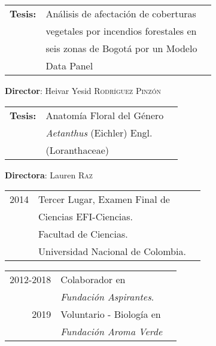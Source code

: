 
\vspace{0.2mm}
\begin{tabular}{rll}
     \textbf{Tesis:} & Análisis de afectación de coberturas \\
     & vegetales por incendios forestales en \\ 
     & seis zonas de Bogotá por un Modelo \\
     & Data Panel
\end{tabular}
\textbf{Director}: Heivar Yesid \textsc{Rodríguez Pinzón}
\divider\smallskip

\begin{tabular}{rll}
     \textbf{Tesis:} & Anatomía Floral del Género \\
     & \emph{Aetanthus} (Eichler) Engl. \\ 
     & (Loranthaceae)
\end{tabular}
\textbf{Directora}: Lauren \textsc{Raz}

\begin{tabular}{rll}
   2014 & Tercer Lugar, Examen Final de\\
   &Ciencias EFI-Ciencias. \\
   & Facultad de Ciencias. \\
   & Universidad Nacional de Colombia.
\end{tabular}


\begin{tabular}{rll}
2012-2018 & Colaborador en \\
& \emph{Fundación Aspirantes}.\\
2019 & Voluntario - Biología en \\ 
& \emph{Fundación Aroma Verde}\\
\end{tabular}

